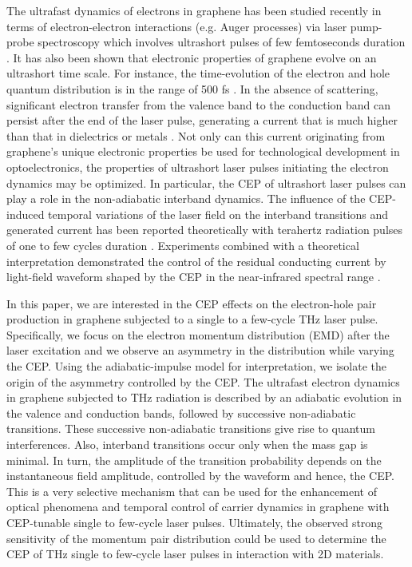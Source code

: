 \documentclass[9pt,twocolumn,twoside]{osajnl}
\begin{document}
The ultrafast dynamics of electrons in graphene has been studied recently in terms of electron-electron interactions (e.g. Auger processes) via laser pump-probe spectroscopy which involves ultrashort pulses of few femtoseconds duration \cite{Brida:2013kn}. It has also been shown that electronic properties of graphene evolve on an ultrashort time scale. For instance,  the time-evolution  of the electron and hole quantum distribution is in the range of 500 fs \cite{Gilberston_JPhysChemLett3_64}. In the absence of scattering, significant electron transfer from the valence band to  the conduction band can persist after the end of the laser pulse, generating a current that is much higher than that in dielectrics or metals \cite{PhysRevB.91.045439}. Not only can this current originating from graphene's unique electronic properties be used for technological development in optoelectronics, the properties of ultrashort laser pulses initiating the electron dynamics may be optimized. In particular, the CEP of ultrashort laser pulses can play a role in the non-adiabatic interband dynamics.
The influence of the CEP-induced temporal variations of the laser field on the interband transitions and generated current has been reported theoretically with  terahertz radiation pulses of one to few cycles duration \cite{1367-2630-15-5-055021}.  Experiments combined with a theoretical interpretation demonstrated the control of the residual conducting current by light-field waveform shaped by the CEP in the near-infrared spectral range  \cite{Higuchi:2017fk}.

In this paper, we are interested in the CEP effects on the electron-hole pair production in graphene subjected to a single to a few-cycle THz laser pulse. Specifically, we focus on the electron momentum distribution (EMD) after the laser excitation and we observe an asymmetry in the distribution while varying the CEP. Using the adiabatic-impulse model for interpretation, we isolate the origin of the asymmetry controlled by the CEP.
The ultrafast electron dynamics in graphene subjected to THz radiation is described by an adiabatic evolution in the valence and conduction bands, followed by successive non-adiabatic transitions. These successive non-adiabatic transitions give rise to quantum interferences.
Also, interband transitions occur only when the mass gap is minimal. In turn, the amplitude of the transition probability depends on the instantaneous field amplitude, controlled by the waveform and hence, the CEP. 
%
This is a very selective mechanism that can be used for  the enhancement of optical phenomena and temporal control of carrier dynamics in graphene with CEP-tunable single to few-cycle laser pulses. 
%
Ultimately, the observed strong sensitivity of the momentum pair distribution could be used to determine the CEP of THz single to few-cycle laser pulses in interaction with 2D materials. 
\end{document}

